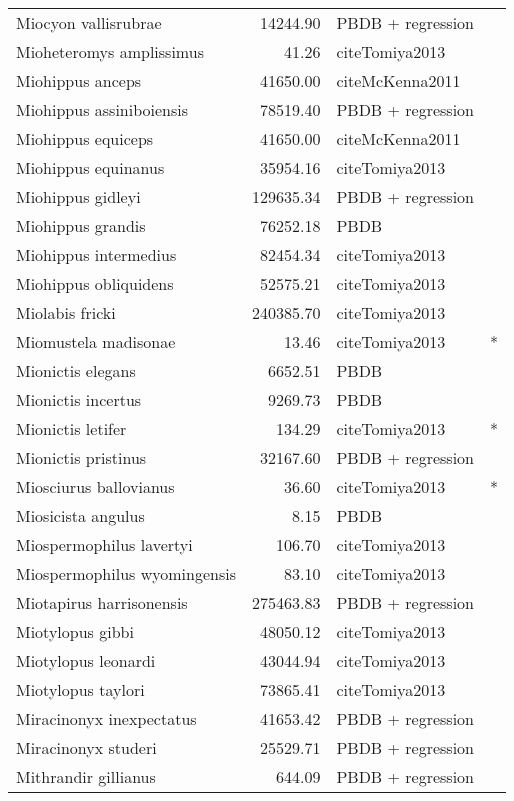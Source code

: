\begin{table}[ht]
\begin{tabular}{lrll}
  Miocyon vallisrubrae & 14244.90 & PBDB + regression &  \\ 
  Mioheteromys amplissimus & 41.26 & cite{Tomiya2013} &  \\ 
  Miohippus anceps & 41650.00 & cite{McKenna2011} &  \\ 
  Miohippus assiniboiensis & 78519.40 & PBDB + regression &  \\ 
  Miohippus equiceps & 41650.00 & cite{McKenna2011} &  \\ 
  Miohippus equinanus & 35954.16 & cite{Tomiya2013} &  \\ 
  Miohippus gidleyi & 129635.34 & PBDB + regression &  \\ 
  Miohippus grandis & 76252.18 & PBDB &  \\ 
  Miohippus intermedius & 82454.34 & cite{Tomiya2013} &  \\ 
  Miohippus obliquidens & 52575.21 & cite{Tomiya2013} &  \\ 
  Miolabis fricki & 240385.70 & cite{Tomiya2013} &  \\ 
  Miomustela madisonae & 13.46 & cite{Tomiya2013} & * \\ 
  Mionictis elegans & 6652.51 & PBDB &  \\ 
  Mionictis incertus & 9269.73 & PBDB &  \\ 
  Mionictis letifer & 134.29 & cite{Tomiya2013} & * \\ 
  Mionictis pristinus & 32167.60 & PBDB + regression &  \\ 
  Miosciurus ballovianus & 36.60 & cite{Tomiya2013} & * \\ 
  Miosicista angulus & 8.15 & PBDB &  \\ 
  Miospermophilus lavertyi & 106.70 & cite{Tomiya2013} &  \\ 
  Miospermophilus wyomingensis & 83.10 & cite{Tomiya2013} &  \\ 
  Miotapirus harrisonensis & 275463.83 & PBDB + regression &  \\ 
  Miotylopus gibbi & 48050.12 & cite{Tomiya2013} &  \\ 
  Miotylopus leonardi & 43044.94 & cite{Tomiya2013} &  \\ 
  Miotylopus taylori & 73865.41 & cite{Tomiya2013} &  \\ 
  Miracinonyx inexpectatus & 41653.42 & PBDB + regression &  \\ 
  Miracinonyx studeri & 25529.71 & PBDB + regression &  \\ 
  Mithrandir gillianus & 644.09 & PBDB + regression &  \\ 

\end{tabular}
\end{table}
